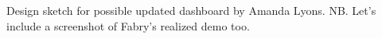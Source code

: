 Design sketch for possible updated dashboard by Amanda Lyons.  NB.  Let's include a screenshot of Fabry's realized demo too.